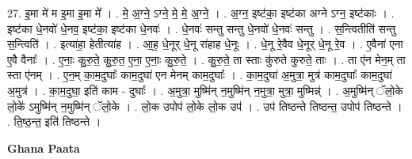\documentclass[17pt]{extarticle}
\begin{document}
27. इ॒मा मे॑ म इ॒मा इ॒मा मे᳚ । . मे॒ अ॒ग्ने॒ ऽग्ने॒ मे॒ मे॒ अ॒ग्ने॒ । . अ॒ग्न॒ इष्ट॑का॒ इष्ट॑का अग्ने ऽग्न॒ इष्ट॑काः । . इष्ट॑का धे॒नवो॑ धे॒नव॒ इष्ट॑का॒ इष्ट॑का धे॒नवः॑ । . धे॒नवः॑ सन्तु सन्तु धे॒नवो॑ धे॒नवः॑ सन्तु । . स॒न्त्वितीति॑ सन्तु स॒न्त्विति॑ । . इत्या॑हा॒ हेतीत्या॑ह । . आ॒ह॒ धे॒नूर् धे॒नू रा॑हाह धे॒नूः । . धे॒नू रे॒वैव धे॒नूर् धे॒नू रे॒व । . ए॒वैना॑ एना ए॒वै वैनाः᳚ । . ए॒नाः॒ कु॒रु॒ते॒ कु॒रु॒त॒ ए॒ना॒ ए॒नाः॒ कु॒रु॒ते॒ । . कु॒रु॒ते॒ ता स्ताः कु॑रुते कुरुते॒ ताः । . ता ए॑न मेन॒म् ता स्ता ए॑नम् । . ए॒न॒म् का॒म॒दुघाः᳚ काम॒दुघा॑ एन मेनम् काम॒दुघाः᳚ । . का॒म॒दुघा॑ अ॒मुत्रा॒ मुत्र॑ काम॒दुघाः᳚ काम॒दुघा॑ अ॒मुत्र॑ । . का॒म॒दुघा॒ इति॑ काम - दुघाः᳚ । . अ॒मुत्रा॒ मुष्मि॑न् न॒मुष्मि॑न् न॒मुत्रा॒ मुत्रा॒ मुष्मिन्न्॑ । . अ॒मुष्मि॑न् ॅलो॒के लो॒के॑ ऽमुष्मि॑न् न॒मुष्मि॑न् ॅलो॒के । . लो॒क उपोप॑ लो॒के लो॒क उप॑ । . उप॑ तिष्ठन्ते तिष्ठन्त॒ उपोप॑ तिष्ठन्ते । . ति॒ष्ठ॒न्त॒ इति॑ तिष्ठन्ते । \newline

\textbf{Ghana Paata } \newline
\end{document}
